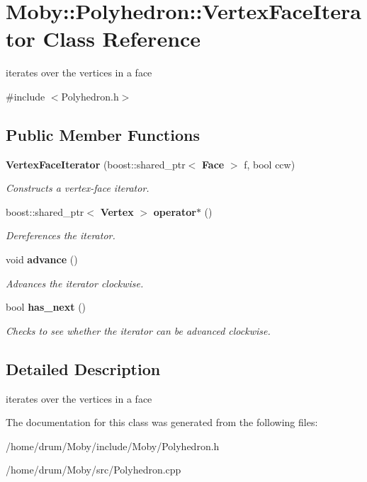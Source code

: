 \section{Moby\-:\-:Polyhedron\-:\-:Vertex\-Face\-Iterator Class Reference}
\label{classMoby_1_1Polyhedron_1_1VertexFaceIterator}


iterates over the vertices in a face  




{\ttfamily \#include $<$Polyhedron.\-h$>$}

\subsection*{Public Member Functions}
\begin{DoxyCompactItemize}
\item 
{\bf Vertex\-Face\-Iterator} (boost\-::shared\-\_\-ptr$<$ {\bf Face} $>$ f, bool ccw)\label{classMoby_1_1Polyhedron_1_1VertexFaceIterator_ae2de585726932356c80a79d35c52fadb}

\begin{DoxyCompactList}\small\item\em Constructs a vertex-\/face iterator. \end{DoxyCompactList}\item 
boost\-::shared\-\_\-ptr$<$ {\bf Vertex} $>$ {\bf operator$\ast$} ()\label{classMoby_1_1Polyhedron_1_1VertexFaceIterator_a2535b33381be6d72626253f67b428673}

\begin{DoxyCompactList}\small\item\em Dereferences the iterator. \end{DoxyCompactList}\item 
void {\bf advance} ()\label{classMoby_1_1Polyhedron_1_1VertexFaceIterator_a02d28667cae83257139ab8e5a42658fc}

\begin{DoxyCompactList}\small\item\em Advances the iterator clockwise. \end{DoxyCompactList}\item 
bool {\bf has\-\_\-next} ()\label{classMoby_1_1Polyhedron_1_1VertexFaceIterator_a4ca4778616f48b9426d69e053a149863}

\begin{DoxyCompactList}\small\item\em Checks to see whether the iterator can be advanced clockwise. \end{DoxyCompactList}\end{DoxyCompactItemize}


\subsection{Detailed Description}
iterates over the vertices in a face 

The documentation for this class was generated from the following files\-:\begin{DoxyCompactItemize}
\item 
/home/drum/\-Moby/include/\-Moby/Polyhedron.\-h\item 
/home/drum/\-Moby/src/Polyhedron.\-cpp\end{DoxyCompactItemize}
